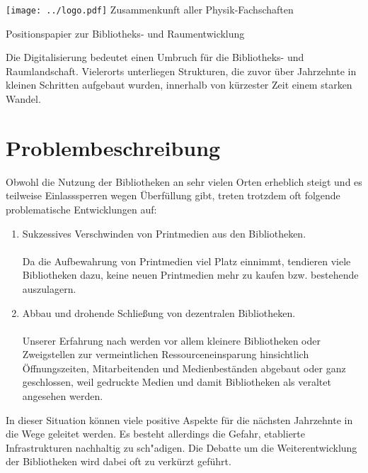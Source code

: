 \documentclass[DIV=calc]{scrartcl}
\begin{document}
  \hspace{0.87\textwidth}
  \begin{minipage}{120pt}
  	\vspace{-1.8cm}
  	\texttt{[image: ../logo.pdf]}
  	\centering
  	\small Zusammenkunft aller Physik-Fachschaften
  \end{minipage}
  \begin{center}
    \huge{Positionspapier zur Bibliotheks- und Raumentwicklung}\vspace{.25\baselineskip}\\
  	\normalsize
  \end{center}
  \vspace{1cm}


Die Digitalisierung bedeutet einen Umbruch für die Bibliotheks- und Raumlandschaft.
Vielerorts unterliegen Strukturen, die zuvor über Jahrzehnte in kleinen Schritten aufgebaut wurden, innerhalb von kürzester Zeit einem starken Wandel.

\section{Problembeschreibung}

Obwohl die Nutzung der Bibliotheken an sehr vielen Orten erheblich steigt und es teilweise Einlasssperren wegen Überfüllung gibt, treten trotzdem oft folgende problematische Entwicklungen auf:

\begin{enumerate}
\item Sukzessives Verschwinden von Printmedien aus den Bibliotheken.\\
\\Da die Aufbewahrung von Printmedien viel Platz einnimmt, tendieren viele Bibliotheken dazu, keine neuen Printmedien mehr zu kaufen bzw. bestehende auszulagern.
\item Abbau und drohende Schließung von dezentralen Bibliotheken. \\
%
\\ Unserer Erfahrung nach werden vor allem kleinere Bibliotheken oder Zweigstellen zur vermeintlichen Ressourceneinsparung hinsichtlich Öffnungszeiten, Mitarbeitenden und Medienbeständen abgebaut oder ganz geschlossen, weil gedruckte Medien und damit Bibliotheken als veraltet angesehen werden.

\end{enumerate}
In dieser Situation können viele positive Aspekte für die nächsten Jahrzehnte in die Wege geleitet werden. Es besteht allerdings die Gefahr, etablierte Infrastrukturen nachhaltig zu sch"adigen. Die Debatte um die Weiterentwicklung der Bibliotheken wird dabei oft zu verkürzt geführt.\\ \\
\end{document}
